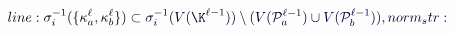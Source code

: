 \documentclass[12pt]{article}
\begin{document}
\makeatletter
\renewcommand*{\@textcolor}[3]{%
  \protect\leavevmode
  \begingroup
    \color#1{#2}#3%
  \endgroup
}
\makeatother
\begin{displaymath}
\mathcolor[RGB]{0,0,15}{line:
\sigma_i^{-1}(\{\kappa_a^\ell,\kappa_b^\ell\})\subset} \mathcolor[RGB]{0,0,30}{\sigma_i^{-1}(V(\K^{\ell-1}))\setminus} \mathcolor[RGB]{0,0,45}{(V(\mathcal{P}_a^{\ell-1})\cup} \mathcolor[RGB]{0,0,60}{V(\mathcal{P}_b^{\ell-1})),

norm_str:}
\end{displaymath}
\end{document}
